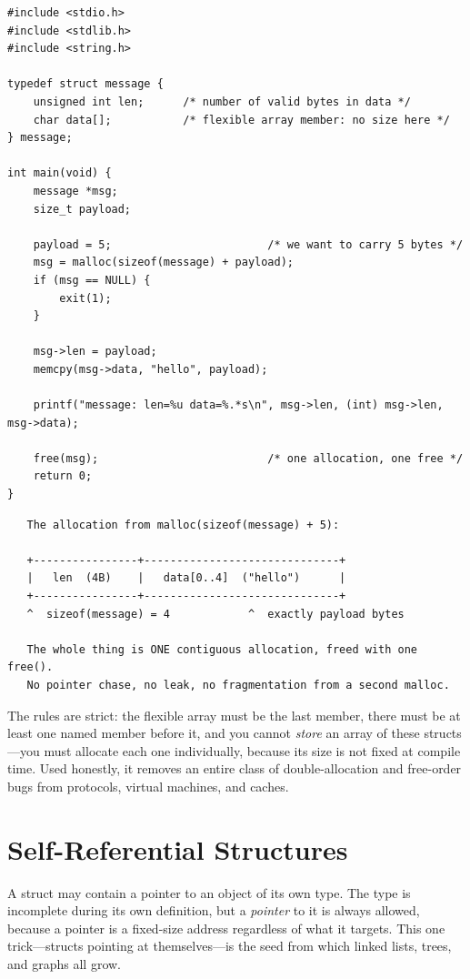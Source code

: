 \begin{lstlisting}[caption={One allocation holds header and payload together.}]
#include <stdio.h>
#include <stdlib.h>
#include <string.h>

typedef struct message {
    unsigned int len;      /* number of valid bytes in data */
    char data[];           /* flexible array member: no size here */
} message;

int main(void) {
    message *msg;
    size_t payload;

    payload = 5;                        /* we want to carry 5 bytes */
    msg = malloc(sizeof(message) + payload);
    if (msg == NULL) {
        exit(1);
    }

    msg->len = payload;
    memcpy(msg->data, "hello", payload);

    printf("message: len=%u data=%.*s\n", msg->len, (int) msg->len, msg->data);

    free(msg);                          /* one allocation, one free */
    return 0;
}
\end{lstlisting}

\begin{verbatim}
   The allocation from malloc(sizeof(message) + 5):

   +----------------+------------------------------+
   |   len  (4B)    |   data[0..4]  ("hello")      |
   +----------------+------------------------------+
   ^  sizeof(message) = 4            ^  exactly payload bytes

   The whole thing is ONE contiguous allocation, freed with one free().
   No pointer chase, no leak, no fragmentation from a second malloc.
\end{verbatim}

The rules are strict: the flexible array must be the last member, there
must be at least one named member before it, and you cannot
\emph{store} an array of these structs---you must allocate each one
individually, because its size is not fixed at compile time. Used
honestly, it removes an entire class of double-allocation and
free-order bugs from protocols, virtual machines, and caches.

\section{Self-Referential Structures}

A struct may contain a pointer to an object of its own type. The type
is incomplete during its own definition, but a \emph{pointer} to it is
always allowed, because a pointer is a fixed-size address regardless of
what it targets. This one trick---structs pointing at themselves---is
the seed from which linked lists, trees, and graphs all grow.

